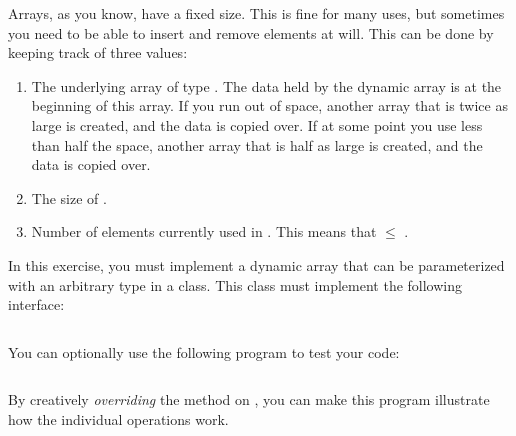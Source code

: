Arrays, as you know, have a fixed size. This is fine for many uses, but sometimes you need to be able to insert and remove elements at will. This can be done by keeping track of three values:
\begin{enumerate}
  \item {} The underlying array of type . The data held by the dynamic array is at the beginning of this array. If you run out of space, another array that is twice as large is created, and the data is copied over. If at some point you use less than half the space, another array that is half as large is created, and the data is copied over.
  \item {} The size of .
  \item {} Number of elements currently used in . This means that  $\leq$ .
\end{enumerate}

In this exercise, you must implement a dynamic array that can be parameterized with an arbitrary type in a  class. This class must implement the following interface:

\inputminted[fontsize=\small]{csharp}{\context/answer/IDynArray.cs}

You can optionally use the following program to test your code:

\inputminted[fontsize=\small]{csharp}{\context/answer/Program.cs}

By creatively \textsl{overriding} the  method on , you can make this program illustrate how the individual operations work.

